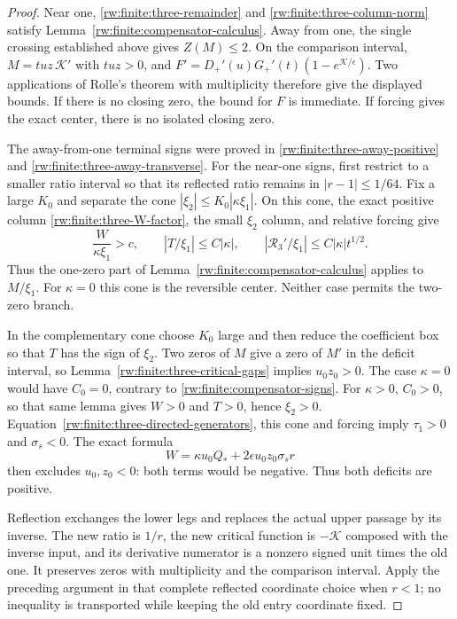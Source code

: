 \begin{proof}
Near one, \eqref{rw:finite:three-remainder} and
\eqref{rw:finite:three-column-norm} satisfy
Lemma~\ref{rw:finite:compensator-calculus}. Away from one, the
single crossing established above gives $Z(M)\le2$.
On the comparison interval, $M=tuz\,\mathcal K'$ with $tuz>0$,
and $F'=D_+'(u)G_+'(t)(1-e^{\mathcal K/\epsilon})$.
Two applications of Rolle's theorem with multiplicity therefore give
the displayed bounds. If there is no closing zero, the bound for $F$
is immediate. If forcing gives the exact center, there is no isolated
closing zero.

The away-from-one terminal signs were proved in
\eqref{rw:finite:three-away-positive} and
\eqref{rw:finite:three-away-transverse}. For the near-one signs,
first restrict to a smaller ratio interval so that its reflected
ratio remains in $|r-1|\le1/64$.
Fix a large $K_0$ and separate the cone
$|\xi_2|\le K_0|\kappa\xi_1|$.
On this cone, the exact positive column
\eqref{rw:finite:three-W-factor}, the small $\xi_2$ column,
and relative forcing give
\[
 \frac{W}{\kappa\xi_1}>c,\qquad
 |T/\xi_1|\le C|\kappa|,\qquad
 |\mathcal R_3'/\xi_1|\le C|\kappa|t^{1/2}.
\]
Thus the one-zero part of
Lemma~\ref{rw:finite:compensator-calculus} applies to $M/\xi_1$.
For $\kappa=0$ this cone is the reversible center. Neither case
permits the two-zero branch.

In the complementary cone choose $K_0$ large and then reduce the
coefficient box so that $T$ has the sign of $\xi_2$.
Two zeros of $M$ give a zero of $M'$ in the deficit interval, so
Lemma~\ref{rw:finite:three-critical-gaps} implies $u_0z_0>0$.
The case $\kappa=0$ would have $C_0=0$, contrary to
\eqref{rw:finite:compensator-signs}. For $\kappa>0$, $C_0>0$,
so that same lemma gives $W>0$ and $T>0$, hence $\xi_2>0$.
Equation~\eqref{rw:finite:three-directed-generators}, this cone and
forcing imply $\tau_1>0$ and $\sigma_s<0$.
The exact formula
\[
 W=\kappa u_0Q_*+2\epsilon u_0z_0\sigma_s r
\]
then excludes $u_0,z_0<0$: both terms would be negative.
Thus both deficits are positive.

Reflection exchanges the lower legs and replaces the actual upper
passage by its inverse. The new ratio is $1/r$, the new critical
function is $-\mathcal K$ composed with the inverse input, and its
derivative numerator is a nonzero signed unit times the old one.
It preserves zeros with multiplicity and the comparison interval.
Apply the preceding argument in that complete reflected coordinate
choice when $r<1$; no inequality is transported while keeping the
old entry coordinate fixed.


\end{proof}
